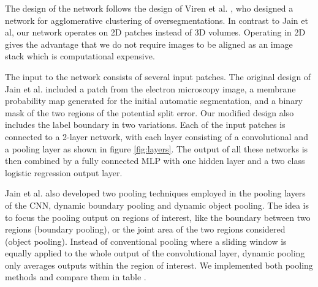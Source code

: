 The design of the network follows the design of Viren et al. , who designed a network for agglomerative clustering of oversegmentations. In contrast to Jain et al, our network operates on 2D patches instead of 3D volumes. Operating in 2D gives the advantage that we do not require images to be aligned as an image stack which is computational expensive. 

The input to the network consists of several input patches. The original design of Jain et al. included a patch from the electron microscopy image, a membrane probability map generated for the initial automatic segmentation, and a binary mask of the two regions of the potential split error. Our modified design also includes the label boundary in two variations.
Each of the input patches is connected to a 2-layer network, with each layer consisting of a convolutional and a pooling layer as shown in figure \ref{fig:layers}. The output of all these networks is then combined by a fully connected MLP with one hidden layer and a two class logistic regression output layer. 

Jain et al. also developed two pooling techniques employed in the pooling layers of the CNN, dynamic boundary pooling and dynamic object pooling. The idea is to focus the pooling output on regions of interest, like the boundary between two regions (boundary pooling), or the joint area of the two regions considered (object pooling). Instead of conventional pooling where a sliding window is equally applied to the whole output of the convolutional layer, dynamic pooling only averages outputs within the region of interest. We implemented both pooling methods and compare them in table .

